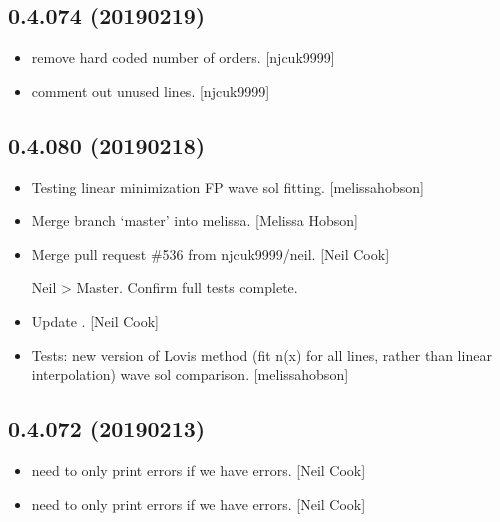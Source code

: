 \documentclass[a4paper,10pt,english]{report}
\begin{document}
\subsection{0.4.074 (2019\sphinxhyphen{}02\sphinxhyphen{}19)}
\label{\detokenize{misc/changelog:id203}}\begin{itemize}
\item {} 
 \sphinxhyphen{} remove hard coded number of orders. {[}njcuk9999{]}

\item {} 
 \sphinxhyphen{} comment out unused lines. {[}njcuk9999{]}

\end{itemize}


\subsection{0.4.080 (2019\sphinxhyphen{}02\sphinxhyphen{}18)}
\label{\detokenize{misc/changelog:id204}}\begin{itemize}
\item {} 
Testing linear minimization FP wave sol fitting. {[}melissa\sphinxhyphen{}hobson{]}

\item {} 
Merge branch ‘master’ into melissa. {[}Melissa Hobson{]}

\item {} 
Merge pull request \#536 from njcuk9999/neil. {[}Neil Cook{]}

Neil \textendash{}\textgreater{} Master. Confirm full tests complete.

\item {} 
Update . {[}Neil Cook{]}

\item {} 
Tests: \sphinxhyphen{}new version of Lovis method (fit n(x) for all lines, rather
than linear interpolation) \sphinxhyphen{} wave sol comparison. {[}melissa\sphinxhyphen{}hobson{]}

\end{itemize}


\subsection{0.4.072 (2019\sphinxhyphen{}02\sphinxhyphen{}13)}
\label{\detokenize{misc/changelog:id205}}\begin{itemize}
\item {} 
 \sphinxhyphen{} need to only print errors if we have errors.
{[}Neil Cook{]}

\item {} 
 \sphinxhyphen{} need to only print errors if we have errors.
{[}Neil Cook{]}

\end{itemize}
\end{document}

